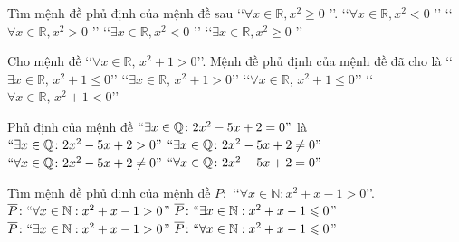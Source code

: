 \begin{ex}%
	Tìm  mệnh đề phủ định của mệnh đề sau \lq \lq $\forall x \in \mathbb{R},x^2 \geq 0$ \rq \rq.
	 \choice
		{\lq \lq $\forall  x \in \mathbb{R},x^2<0$ \rq \rq}
		 {\lq \lq $\forall x \in \mathbb{R},x^2>0$ \rq \rq}
		{\True \lq \lq $\exists x \in  \mathbb{R},x^2<0$ \rq \rq}
		{\lq \lq $\exists x \in \mathbb{R},x^2 \geq 0$ \rq  \rq}
\end{ex}

\begin{ex}%
	Cho mệnh đề \lq\lq$\forall x\in \mathbb{R},\, x^2+1>0$\rq \rq.  Mệnh đề phủ định của mệnh đề đã cho là
	 \choice
		{\True  \lq\lq$\exists x\in \mathbb{R},\, x^2+1\leq 0$\rq \rq}
		{\lq\lq$\exists x\in \mathbb{R},\,  x^2+1>0$\rq \rq}
		{\lq\lq$\forall x\in \mathbb{R},\, x^2+1\leq 0$\rq  \rq}
		 {\lq\lq$\forall x\in \mathbb{R},\, x^2+1<0$\rq \rq}
\end{ex}

\begin{ex}%
	Phủ định của mệnh đề $``\exists x\in \mathbb{Q}\colon 2x^2-5x+2=0"$  là
	 \choice
		{$``\exists  x\in \mathbb{Q}\colon 2x^2-5x+2>0"$}
		{$``\exists x\in \mathbb{Q}\colon 2x^2-5x+2\ne 0"$} 
		{\True $``\forall x\in  \mathbb{Q}\colon 2x^2-5x+2\ne 0"$}
		{$``\forall x\in \mathbb{Q}\colon  2x^2-5x+2=0"$}
\end{ex}

\begin{ex}%
	Tìm mệnh đề phủ định của  mệnh đề $P\colon$ \lq\lq$\forall x\in \mathbb{N}:x^2+x-1>0$\rq\rq.
	\choice 
		 {$\overline{P}\colon ``\forall x\in \mathbb{N}:x^2+x-1>0$''}
		{\True $\overline{P}\colon ``\exists x\in  \mathbb{N}:x^2+x-1\leqslant 0$''}
		 {$\overline{P}\colon ``\exists x\in \mathbb{N}:x^2+x-1>0$''}
		{$\overline{P}\colon ``\forall  x\in \mathbb{N}:x^2+x-1\leqslant 0$''}
\end{ex}

